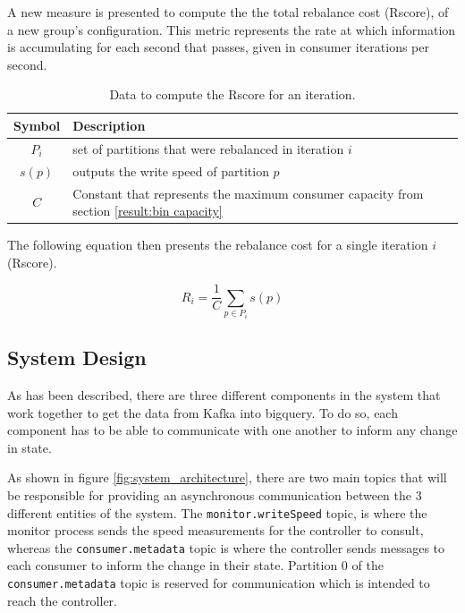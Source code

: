 A new measure is presented to compute the the total rebalance cost (Rscore), of
a new group's configuration. This metric represents the rate at which
information is accumulating for each second that passes, given in consumer
iterations per second.

\begin{table}[H] 
\centering 
\caption{Data to compute the Rscore for an iteration.} 
    \begin{tabular}{ |c|l| } 
        \hline 
        \textbf{Symbol} & \textbf{Description} \\ 
        \hline 
        $P_i$ & set of partitions that were rebalanced in iteration $i$ \\ 
        $s(p)$ & outputs the write speed of partition $p$ \\ 
        $C$ &  Constant that represents the maximum consumer capacity from
            section \ref{result:bin capacity}\\ 
        \hline 
    \end{tabular} 
\end{table}

The following equation then presents the rebalance cost for a single
iteration $i$ (Rscore).

\begin{equation} 
    R_i = \frac{1}{C}\sum_{p \in P_i} s(p) 
\end{equation}


\subsection{System Design}

As has been described, there are three different components in the system that
work together to get the data from Kafka into bigquery. To do so, each component
has to be able to communicate with one another to inform any change in state.

As shown in figure \ref{fig:system_architecture}, there are two main topics that
will be responsible for providing an asynchronous communication between the 3
different entities of the system. The \lstinline{monitor.writeSpeed} topic, is
where the monitor process sends the speed measurements for the controller to
consult, whereas the \lstinline{consumer.metadata} topic is where the controller
sends messages to each consumer to inform the change in their state. Partition 0
of the \lstinline{consumer.metadata} topic is reserved for communication which
is intended to reach the controller.

